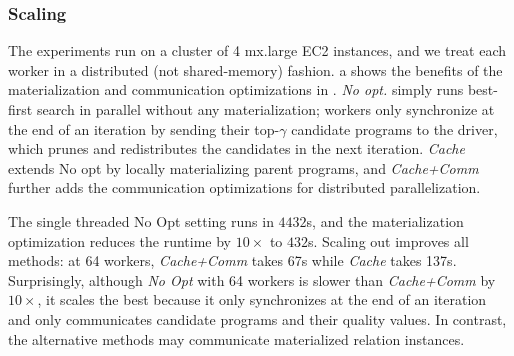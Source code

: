 

\subsubsection{Scaling}

 The experiments run on a cluster of 4 mx.large EC2 instances, and we treat each worker in a distributed (not shared-memory) fashion.   a shows the benefits of the materialization and communication optimizations in .  {\it No opt.} simply runs best-first search in parallel without any materialization; workers only synchronize at the end of an iteration by sending their top-$\gamma$ candidate programs to the driver, which prunes and redistributes the candidates in the next iteration.  {\it Cache} extends No opt by locally materializing parent programs, and {\it Cache+Comm} further adds the communication optimizations for distributed parallelization.   

The single threaded No Opt setting runs in $4432$s, and the materialization optimization reduces the runtime by $10\times$ to $432$s.   Scaling out improves all methods: at 64 workers, {\it Cache+Comm} takes 67s while {\it Cache} takes 137s.  Surprisingly, although {\it No Opt} with 64 workers is slower than {\it Cache+Comm} by $10\times$, it scales the best because it only synchronizes at the end of an iteration and only communicates candidate programs and their quality values.  In contrast, the alternative methods may communicate materialized relation instances.  

